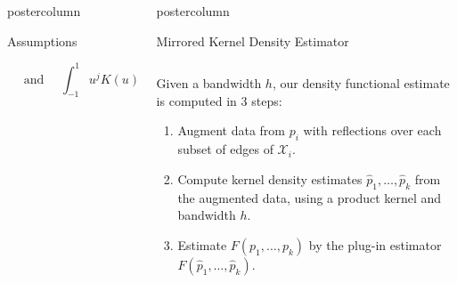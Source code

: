 \documentclass[final,hyperref={pdfpagelabels=false}]{beamer}
\newcommand{\X}{\mathcal{X}}
\newlength{\columnheight}
\begin{document}
\begin{frame}
\begin{columns}
\begin{column}{.32\textwidth}
\begin{beamercolorbox}[center,wd=\textwidth]{postercolumn}
\begin{minipage}[T]{.95\textwidth}
{\begin{block}{Assumptions}
\begin{itemize}
\[                                    \quad \mbox{ and } \quad
                                    \int_{-1}^1 u^j K(u) \, du = 0,
                                    \quad
                                    \forall j \in \{1,\dots,\ell\}.\]
              \end{itemize}
            \end{block}
            \vfill
          }
        \end{minipage}
      \end{beamercolorbox}
    \end{column}

    \begin{column}{.32\textwidth}
      \begin{beamercolorbox}[center,wd=\textwidth]{postercolumn}
        \begin{minipage}[T]{.95\textwidth} %
          \parbox[t][\columnheight]{\textwidth}{ %
            \vfill
            \begin{block}{Mirrored Kernel Density Estimator}
              \begin{columns}
                \begin{column}{.63\textwidth}
                  {\footnotesize
                  Given a bandwidth $h$, our density functional estimate is
                  computed in 3 steps:}
                  \vspace{12mm}
                  \begin{enumerate}
                  \item Augment data from $p_i$ with reflections over each
                        subset of edges of $\X_i$.
                  \item Compute kernel density estimates
                        $\hat p_1,\dots,\hat p_k$ from the augmented data,
                        using a product kernel and bandwidth $h$.
                  \item Estimate $F(p_1,\dots,p_k)$ by the plug-in estimator
                        $F(\hat p_1,\dots,\hat p_k)$.

\end{enumerate}
\end{column}
\end{columns}
\end{block}}
\end{minipage}
\end{beamercolorbox}
\end{column}
\end{columns}
\end{frame}
\end{document}
